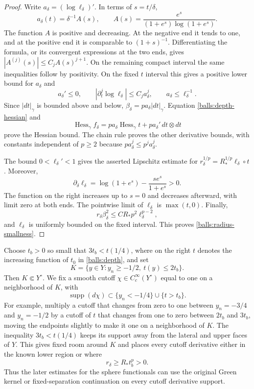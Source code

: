 \begin{proof}
Write $a_\delta=(\log\ell_\delta)'$.  In terms of $s=t/\delta$,
\[
 a_\delta(t)=\delta^{-1}A(s),\qquad
 A(s)=\frac{e^s}{(1+e^s)\log(1+e^s)}.
\]
The function $A$ is positive and decreasing.  At the negative end it
tends to one, and at the positive end it is comparable to $(1+s)^{-1}$.
Differentiating the formula, or its convergent expressions at the two
ends, gives $|A^{(j)}(s)|\leq C_jA(s)^{j+1}$.  On the remaining compact
interval the same inequalities follow by positivity.  On the fixed
$t$ interval this gives a positive lower bound for $a_\delta$ and
\[
 a_\delta'\leq0,\qquad
 |\partial_t^j\log\ell_\delta|\leq C_j a_\delta^j,
 \qquad a_\delta\leq\ell_\delta^{-1}.
\]
Since $|dt|_\gamma$ is bounded above and below,
$\beta_\delta=p a_\delta|dt|_\gamma$.  Equation
\eqref{balls:depth-hessian} and
\[
 \operatorname{Hess}_\gamma f_\delta
   =p a_\delta\operatorname{Hess}_\gamma t
          +p a_\delta'\,dt\otimes dt
\]
prove the Hessian bound.  The chain rule proves the other derivative
bounds, with constants independent of $p\geq2$ because
$p a_\delta^j\leq p^j a_\delta^j$.

The bound $0<\ell_\delta'<1$ gives the asserted Lipschitz estimate for
$r_\delta^{1/p}=R_*^{1/p}\ell_\delta\circ t$.  Moreover,
\[
 \partial_\delta\ell_\delta
  =\log(1+e^s)-\frac{s e^s}{1+e^s}>0.
\]
The function on the right increases up to $s=0$ and decreases afterward,
with limit zero at both ends.  The pointwise limit of $\ell_\delta$ is
$\max(t,0)$.  Finally,
\[
 r_\delta\beta_\delta^2
       \leq C R_*p^2\ell_\delta^{p-2},
\]
and $\ell_\delta$ is uniformly bounded on the fixed interval.  This
proves \eqref{balls:radius-smallness}.
\end{proof}

Choose $t_b>0$ so small that $3t_b<t(1/4)$, where on the right $t$ denotes
the increasing function of $t_0$ in \eqref{balls:depth}, and set
\begin{equation}\label{balls:K}
 K=\{y\in Y:y_n\geq-1/2,\ t(y)\leq2t_b\}.
\end{equation}
Then $K\Subset Y^\circ$.  We fix a smooth cutoff $\chi\in
C_c^\infty(Y^\circ)$ equal to one on a neighborhood of $K$, with
\begin{equation}\label{balls:cutoff-region}
 \operatorname{supp}(d\chi)\subset
       \{y_n<-1/4\}\cup\{t>t_b\}.
\end{equation}
For example, multiply a cutoff that changes from zero to one between
$y_n=-3/4$ and $y_n=-1/2$ by a cutoff of $t$ that changes from one to zero
between $2t_b$ and $3t_b$, moving the endpoints slightly to make it one
on a neighborhood of $K$.  The inequality $3t_b<t(1/4)$ keeps its support
away from the lateral and upper faces of $Y$.  This gives fixed room
around $K$ and places every cutoff derivative either in the known lower
region or where
\[
 r_\delta\ge R_*t_b^p>0.
\]
Thus the later estimates for the sphere functionals can use the original
Green kernel or fixed-separation continuation on every cutoff derivative
support.

